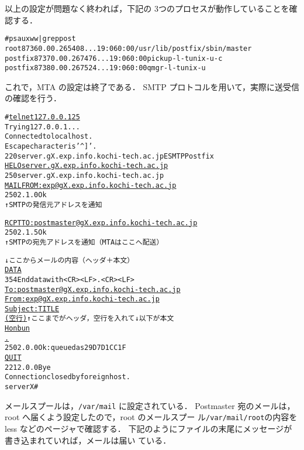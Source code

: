
以上の設定が問題なく終われば，下記の 3つのプロセスが動作していることを確認する．

\begin{center}
\begin{breakbox}
\begin{alltt}
# ps auxww | grep post
root      8736  0.0  0.2  65408  ...19:06   0:00 /usr/lib/postfix/sbin/master
postfix   8737  0.0  0.2  67476  ...19:06   0:00 pickup -l -t unix -u -c
postfix   8738  0.0  0.2  67524  ...19:06   0:00 qmgr -l -t unix -u
\end{alltt}
\end{breakbox}
\end{center}

これで，MTA の設定は終了である．
SMTP プロトコルを用いて，実際に送受信の確認を行う．

\begin{center}
\begin{breakbox}
\begin{alltt}
# \underline{telnet 127.0.0.1 25}
Trying 127.0.0.1...
Connected to localhost.
Escape character is '^]'.
220 server.gX.exp.info.kochi-tech.ac.jp ESMTP Postfix
\underline{HELO server.gX.exp.info.kochi-tech.ac.jp}
250 server.gX.exp.info.kochi-tech.ac.jp
\underline{MAIL FROM: exp@gX.exp.info.kochi-tech.ac.jp}
250 2.1.0 Ok
  ↑SMTP の発信元アドレスを通知

\underline{RCPT TO: postmaster@gX.exp.info.kochi-tech.ac.jp}
250 2.1.5 Ok
  ↑SMTP の宛先アドレスを通知（MTAはここへ配送）

  ↓ここからメールの内容（ヘッダ＋本文）
\underline{DATA}
354 End data with <CR><LF>.<CR><LF>
\underline{To: postmaster@gX.exp.info.kochi-tech.ac.jp}
\underline{From: exp@gX.exp.info.kochi-tech.ac.jp}
\underline{Subject: TITLE}
\underline{(空行)}   ↑ここまでがヘッダ，空行を入れて↓以下が本文
\underline{Honbun}
\underline{.}
250 2.0.0 Ok: queued as 29D7D1CC1F
\underline{QUIT}
221 2.0.0 Bye
Connection closed by foreign host.
serverX#
\end{alltt}
\end{breakbox}
\end{center}

メールスプールは，\texttt{/var/mail} に設定されている．
Postmaster 宛のメールは，root へ届くよう設定したので，root のメールスプー
ル\texttt{/var/mail/root}の内容を less などのページャで確認する．
下記のようにファイルの末尾にメッセージが書き込まれていれば，メールは届い
ている．

